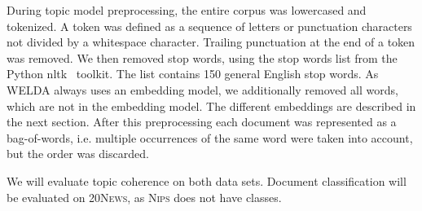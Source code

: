 \documentclass[
        a4paper,
        titlepage,
        twoside,
        parskip,
        numbers=noenddot
        ]{scrbook}
\theoremstyle{break}
\begin{document}
During topic model preprocessing, the entire corpus was lowercased and tokenized.
A token was defined as a sequence of letters or punctuation characters not divided by a whitespace character.
Trailing punctuation at the end of a token was removed.
We then removed stop words, using the stop words list from the Python nltk~\cite{Bird2009} toolkit.
The list contains 150 general English stop words.
As WELDA always uses an embedding model, we additionally removed all words, which are not in the embedding model.
The different embeddings are described in the next section.
After this preprocessing each document was represented as a bag-of-words, i.e. multiple occurrences of the same word were taken into account, but the order was discarded.

We will evaluate topic coherence on both data sets.
Document classification will be evaluated on \textsc{20News}, as \textsc{Nips} does not have classes.
\end{document}
